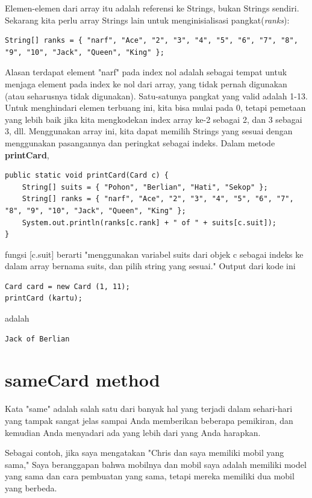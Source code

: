 \documentclass[12pt,b5paper,openright,twoside]{book}
\begin{document}
\noindent Elemen-elemen dari array itu adalah referensi ke Strings, bukan Strings sendiri. Sekarang kita perlu array Strings lain untuk menginisialisasi pangkat(\textit{ranks}):
\begin{lstlisting}
String[] ranks = { "narf", "Ace", "2", "3", "4", "5", "6", "7", "8",    "9", "10", "Jack", "Queen", "King" };
\end{lstlisting}

\noindent Alasan terdapat element "narf" pada index nol adalah sebagai tempat untuk menjaga element pada index ke nol dari array, yang tidak pernah digunakan (atau seharusnya tidak digunakan). Satu-satunya pangkat yang valid adalah 1-13. Untuk menghindari elemen terbuang ini, kita bisa mulai pada 0, tetapi pemetaan yang lebih baik jika kita mengkodekan index array ke-2 sebagai 2, dan 3 sebagai 3, dll.
Menggunakan array ini, kita dapat memilih Strings yang sesuai dengan menggunakan pasangannya dan peringkat sebagai indeks. Dalam metode \textbf{printCard},
\begin{lstlisting}
public static void printCard(Card c) { 
    String[] suits = { "Pohon", "Berlian", "Hati", "Sekop" }; 
    String[] ranks = { "narf", "Ace", "2", "3", "4", "5", "6", "7", "8", "9", "10", "Jack", "Queen", "King" };
    System.out.println(ranks[c.rank] + " of " + suits[c.suit]);
}
\end{lstlisting}

\noindent fungsi [c.suit] berarti "menggunakan variabel suits dari objek c sebagai indeks ke dalam array bernama suits, dan pilih string yang sesuai." Output dari kode ini 
\begin{lstlisting}
Card card = new Card (1, 11); 
printCard (kartu);
\end{lstlisting}

\noindent adalah 
\begin{lstlisting} 
Jack of Berlian 
\end{lstlisting}

\section{sameCard method}
Kata "same" adalah salah satu dari banyak hal yang terjadi dalam sehari-hari yang tampak sangat jelas sampai Anda memberikan beberapa pemikiran, dan kemudian Anda menyadari ada yang lebih dari yang Anda harapkan.

\noindent Sebagai contoh, jika saya mengatakan "Chris dan saya memiliki mobil yang sama," Saya beranggapan bahwa mobilnya dan mobil saya adalah memiliki model yang sama dan cara pembuatan yang sama, tetapi mereka memiliki dua mobil yang berbeda. 
\end{document}
